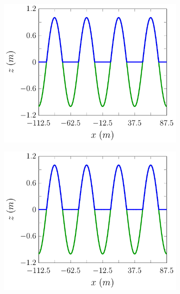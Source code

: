 \begin{figure}
	\centering
	\begin{subfigure}{0.5\textwidth}
		\includegraphics[width=\textwidth]{./chp5/figures/Analytic/LakeAtRest/Example/FEVMWB.pdf}
		\vspace{0.5cm}
	\end{subfigure}%
	\begin{subfigure}{0.5\textwidth}
		\includegraphics[width=\textwidth]{./chp5/figures/Analytic/LakeAtRest/Example/FEVMnWB.pdf}
		\vspace{0.5cm}

\end{subfigure}
\end{figure}
